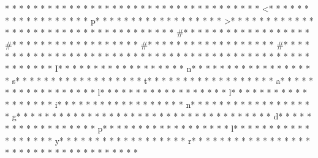 * * *  * * *  * * *  *  * * *  *  * * *  * 	* * *  * * *  * * *  *  * * *  *  * * *  * <* * *  * * *  * * *  *  * * *  *  * * *  * p* * *  * * *  * * *  *  * * *  *  * * *  * >* * *  * * *  * * *  *  * * *  *  * * *  * 
* * *  * * *  * * *  *  * * *  *  * * *  * #* * *  * * *  * * *  *  * * *  *  * * *  * #* * *  * * *  * * *  *  * * *  *  * * *  * #* * *  * * *  * * *  *  * * *  *  * * *  * #* * *  * * *  * * *  *  * * *  *  * * *  *  * * *  * * *  * * *  *  * * *  *  * * *  * {* * *  * * *  * * *  *  * * *  *  * * *  * I* * *  * * *  * * *  *  * * *  *  * * *  * n* * *  * * *  * * *  *  * * *  *  * * *  * s* * *  * * *  * * *  *  * * *  *  * * *  * t* * *  * * *  * * *  *  * * *  *  * * *  * a* * *  * * *  * * *  *  * * *  *  * * *  * l* * *  * * *  * * *  *  * * *  *  * * *  * l* * *  * * *  * * *  *  * * *  *  * * *  * i* * *  * * *  * * *  *  * * *  *  * * *  * n* * *  * * *  * * *  *  * * *  *  * * *  * g* * *  * * *  * * *  *  * * *  *  * * *  *  * * *  * * *  * * *  *  * * *  *  * * *  * d* * *  * * *  * * *  *  * * *  *  * * *  * p* * *  * * *  * * *  *  * * *  *  * * *  * l* * *  * * *  * * *  *  * * *  *  * * *  * y* * *  * * *  * * *  *  * * *  *  * * *  * r* * *  * * *  * * *  *  * * *  *  * * *  * }* * *  * * *  * * *  *  * * *  *  * * *  * 
